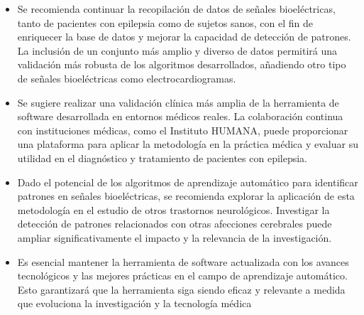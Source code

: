 \begin{itemize}
    \item Se recomienda continuar la recopilación de datos de señales bioeléctricas, tanto de pacientes con epilepsia como de sujetos sanos, con el fin de enriquecer la base de datos y mejorar la capacidad de detección de patrones. La inclusión de un conjunto más amplio y diverso de datos permitirá una validación más robusta de los algoritmos desarrollados, añadiendo otro tipo de señales bioeléctricas como electrocardiogramas.

    \item Se sugiere realizar una validación clínica más amplia de la herramienta de software desarrollada en entornos médicos reales. La colaboración continua con instituciones médicas, como el Instituto HUMANA, puede proporcionar una plataforma para aplicar la metodología en la práctica médica y evaluar su utilidad en el diagnóstico y tratamiento de pacientes con epilepsia.

    \item Dado el potencial de los algoritmos de aprendizaje automático para identificar patrones en señales bioeléctricas, se recomienda explorar la aplicación de esta metodología en el estudio de otros trastornos neurológicos. Investigar la detección de patrones relacionados con otras afecciones cerebrales puede ampliar significativamente el impacto y la relevancia de la investigación.

    \item Es esencial mantener la herramienta de software actualizada con los avances tecnológicos y las mejores prácticas en el campo de aprendizaje automático. Esto garantizará que la herramienta siga siendo eficaz y relevante a medida que evoluciona la investigación y la tecnología médica
    
\end{itemize}